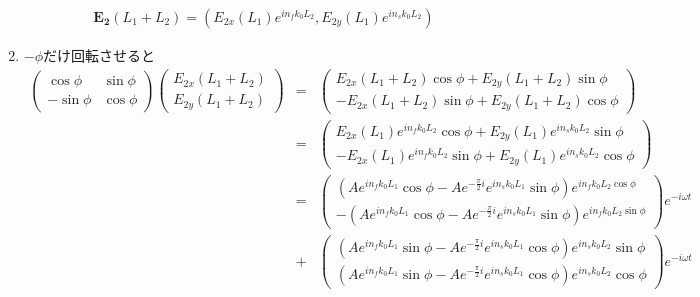 \begin{enumerate}
\begin{eqnarray*}
        \bm{E_2}(L_1+L_2)=(E_{2x}(L_1)e^{in_fk_0L_2}, E_{2y}(L_1)e^{in_sk_0L_2})
    \end{eqnarray*}
    \item
    $-\phi$だけ回転させると
    \begin{eqnarray*}
        \left(\begin{array}{cc}\cos{\phi}&\sin{\phi}\\-\sin{\phi}&\cos{\phi}\end{array}\right)\left(\begin{array}{cc}E_{2x}(L_1+L_2)\\E_{2y}(L_1+L_2)\end{array}\right)&=&\left(\begin{array}{cc}E_{2x}(L_1+L_2)\cos{\phi}+E_{2y}(L_1+L_2)\sin{\phi}\\-E_{2x}(L_1+L_2)\sin{\phi}+E_{2y}(L_1+L_2)\cos{\phi}\end{array}\right)\\
        &=&\left(\begin{array}{cc}E_{2x}(L_1)e^{in_fk_0L_2}\cos{\phi}+E_{2y}(L_1)e^{in_sk_0L_2}\sin{\phi}\\-E_{2x}(L_1)e^{in_fk_0L_2}\sin{\phi}+E_{2y}(L_1)e^{in_sk_0L_2}\cos{\phi}\end{array}\right)\\
        &=&\left(\begin{array}{cc}(Ae^{in_fk_0L_1}\cos{\phi}-Ae^{-\frac{\pi}{2}i}e^{in_sk_0L_1}\sin{\phi})e^{in_fk_0L_2\cos{\phi}}\\-(Ae^{in_fk_0L_1}\cos{\phi}-Ae^{-\frac{\pi}{2}i}e^{in_sk_0L_1}\sin{\phi})e^{in_fk_0L_2\sin{\phi}}\end{array}\right)e^{-i\omega t}\\
        &+&\left(\begin{array}{cc}(Ae^{in_fk_0L_1}\sin{\phi}-Ae^{-\frac{\pi}{2}i}e^{in_sk_0L_1}\cos{\phi})e^{in_sk_0L_2}\sin{\phi}\\(Ae^{in_fk_0L_1}\sin{\phi}-Ae^{-\frac{\pi}{2}i}e^{in_sk_0L_1}\cos{\phi})e^{in_sk_0L_2}\cos{\phi}\end{array}\right)e^{-i\omega t}
    \end{eqnarray*}
\end{enumerate}
